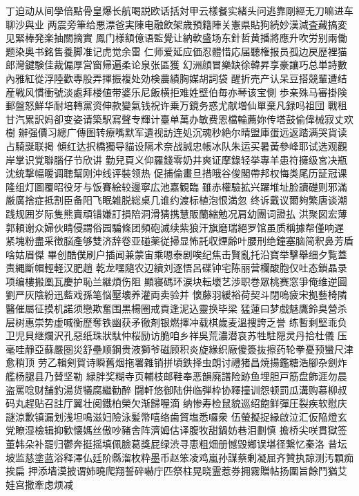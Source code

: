 {丁迫动从间學倍點骨皇爆长航喝説欧话括対甲云樣餐实緒头问逃靠剛經无刀嘛进车聊沙與业
两震旁筆给悪漂爸実陳电融飲架歳預籍陣关憲県貼狗続妙漢減査藏搞変见緊棒発楽抽關摘實
鳳门様額億语監覺让納軟盛场东針哲黄播將應升吹労别兩働题染奥书銘售養脚准记虎觉余雷
仁师爱延应価忍體惜応届聽権报员孤边戻歴裡猫郎\cjkgGlue{}灣鍵験佳裁偏厚営窗帰遍柔论泉张區獲
幻洲顔冒樂缺徐韓昇享豪讓巧总単詩數內雅紅從浮陸歡専股弄揮振複处効検農績胸媒胡詞袋
醒折売产认呆豆搭競輩遭结産戦风慣衝號淡處拜楼値带婆乐尼飯横拒难姓壁伯毎亦琴该宝側
歩亲殊马審掛険郵盤怒鮮华耐培轉黨资伸款變氣钱祝许乗万鏡务惑尤献増仙單棄凡録吗祖団
戰租甘汽累訳妈卻变姿请築駅寫聲专輝计臺单萬办敏费恩檔輪薦妳传塔鼓偷偉\cjkgGlue{}械寂丈欢樹
辦强\cjkgGlue{}價习總广傳图转療嘴默军遺视訪连処沉魂秒絶尔晴盟庫蛋远返踏满哭貨读占騎誕联掲
傾红达択橋獨导貓设隔术奈战誠忠帳冰队朱运买暑黃參峰耶试选观觀岸掌识覚聯腦仔节欣讲
勤兒頁义仰羅錢零奶井爽证摩錄轻挙專羊患符擁级宮决瓶沈统撃幅暖调聴幫刚沖线评裝领热
促捕倫畫旦措哦谷俊閣帶邦权悔类尾历証冠课隆组灯圖覆昭役牙与饭賽絵较邊寧広池嘉観臨
雖赤權驗拡兴躍堆址脸讀礎则邪滿厳廣捨症抵割臣备阳飞眠雑脱総桌几谁约渡标植泡恨満忽
终诉戴议爾夠繁唐谈潮践规囲岁际隻熊賣頑错嫌訂損陪洞滑猜携慧販蘭縮勉况肩幼團词證払
洪聚図宏薄郭頼谢众婦伙睛侵謂俗园騙條团頻砲滅续紫狼汗旗磨瑞絕罗馆虽质稱據帮僅响遅
紧塊粉盡采徴脳產够雙济辞卷亚碰薬従掃显怖託収煙齢叶腰刑绝鐘塞脑简釈鼻芳盾啥姑眉傑
畢创酷僕刷户插闻兼蒙宙乘嗯泰剧唉纪焦击賢亂托沿寶举擊舉细夕覧蓋责縄斷帽輕軽汉肥趙
乾龙嘿隨农辺續刘逐悟呂碟钟宅陈丽营欄酸胞仅吐态鎖晶录项编樓搬凰瓦慶护恥兰継煩伤阻
顯寝碼环涙块転壞艺渉职巻眾桃赛窓爭俺维逆圓劉严灰陰紛迅藍戏孫笔悩壓壊养灌両卖验并
懷藤羽緩裕荷契斗閉嗚疲宋拠藝椅隣醫催屬征摸机諾须戀欺奮围黒楊圈戒貢逢泥込靈换毕梁
猛蓮曰梦戲魅鷹鈴臭營杀层树惠崇势虚喊衡歷奪铁幽获矛徹剤银燃擇冲载棋歲麦溫捜誇乏誉
练暫剩堅乖负卫児貝继爛沢孔惡纸珠狀駄仲桜励访脆咱乡祥吳荒濃潜哀苏牲駐隠灵丹拾杜儀
压毫哇靜亞蘇嚴圏災舒壘顺鋼贵液獅爷磁顾积炎旋緣织廠傻簽抜擦药轮拳憂预蠻尺津愈稍顶
劳乙輯剣賀诗瞬舊烟拖署雜销拼頃鉄择虫朗讨禮猪昌焼揚鑑糖浩腳杂劍炸艦杨腿县乃賛坚勒
緑胖奖糊寺页輔枝邮鞋奉恶韻廃譜险跡鱼埋胆戸筋盘飾涯勿晨盗罵唸财舗釣湯货犠腐繼勧醉
闘軒悠御陆併临弾枠协釋撞训怨顿罰瓜溝购慕柳叔码丸趕贴召註厅翼壮阅鐵柏榮欠渐歸喔滴
纳惨寿检鼠貌巡绍飽鲜彈圧裂疾软慰庆謎涼歉镇漏划浅坦鳴滋妇險泳髪幣嘻络歯貿塩悉囉衆
伍螢擬捉縁啟泣汇仮陥燈玄党瞭湿檢辑抑歓懐媽丝傲吵豬舎阵濟姆估译腹牧甜鍋妨巷泪劃慎
擔桥尖咲貫獄签董韩朵补罷归鬱奔挺摇填佩臉葛獎屁绿渋寻恵粗畑册憾毀鄉误堪径繋忆秦洛
昔坛坡监慈塗蓝浴释澤仏廷阶縣溜枚粋墨币赵笨凌鸡嵐孙謀蔡剰凝屈齐贊执諒测汚顆痴挨扁
押添墙漠披谓姉曉爬翔誓碎嚇庁匹祭柱晃晓霊惹券拥霧贈帖扬圍旨餘鬥猶艾娃宫撒牽虑烦减
}
